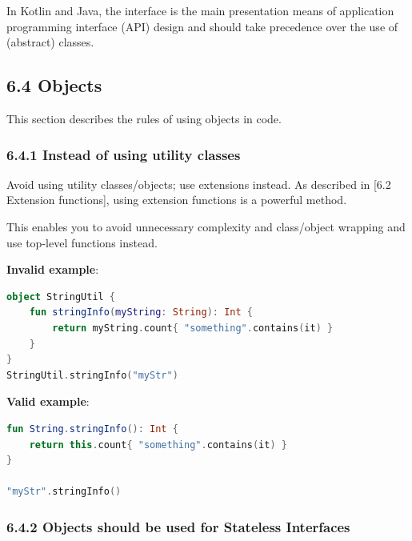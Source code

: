 {{{{In Kotlin and Java, the interface is the main presentation means of application programming interface (API) design and should take precedence over the use of (abstract) classes.



\subsection*{\textbf{6.4 Objects}}

\label{sec:6.4}

This section describes the rules of using objects in code.

\subsubsection*{\textbf{6.4.1 Instead of using utility classes}}
\leavevmode\newline

\label{sec:6.4.1}

Avoid using utility classes/objects; use extensions instead. As described in [6.2 Extension functions], using extension functions is a powerful method.

This enables you to avoid unnecessary complexity and class/object wrapping and use top-level functions instead.



\textbf{Invalid example}:

\begin{lstlisting}[language=Kotlin]
object StringUtil {
    fun stringInfo(myString: String): Int {
        return myString.count{ "something".contains(it) }
    }
}
StringUtil.stringInfo("myStr")
\end{lstlisting}


\textbf{Valid example}:

\begin{lstlisting}[language=Kotlin]
fun String.stringInfo(): Int {
    return this.count{ "something".contains(it) }
}

"myStr".stringInfo()
\end{lstlisting}


\subsubsection*{\textbf{6.4.2 Objects should be used for Stateless Interfaces}}
\leavevmode\newline

\label{sec:6.4.2}

}}}}
